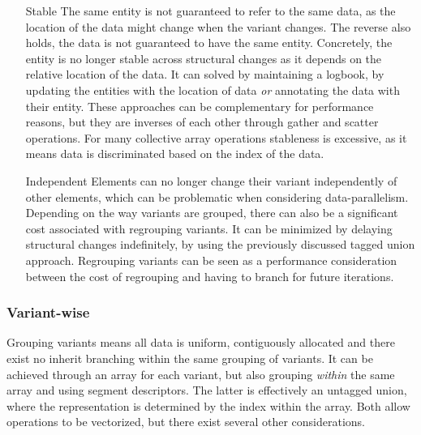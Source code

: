 \documentclass{article}
\begin{document}
\begin{itemize}
    \item [Stable] 
The same entity is not guaranteed to refer to the same data, as the location of the data might change when the variant changes.
The reverse also holds, the data is not guaranteed to have the same entity.
Concretely, the entity is no longer stable across structural changes as it depends on the relative location of the data.
It can solved by maintaining a logbook, by updating the entities with the location of data {\it or} annotating the data with their entity. 
These approaches can be complementary for performance reasons, but they are inverses of each other through gather and scatter operations. 
For many collective array operations stableness is excessive, as it means data is discriminated based on the index of the data. 
    \item [Independent]
Elements can no longer change their variant independently of other elements, which can be problematic when considering data-parallelism.
Depending on the way variants are grouped, there can also be a significant cost associated with regrouping variants.
It can be minimized by delaying structural changes indefinitely, by using the previously discussed tagged union approach.
Regrouping variants can be seen as a performance consideration between the cost of regrouping and having to branch for future iterations.

\end{itemize}    

\newpage

\subsubsection{Variant-wise}

Grouping variants means all data is uniform, contiguously allocated and there exist no inherit branching within the same grouping of variants.
It can be achieved through an array for each variant, but also grouping {\it within} the same array and using segment descriptors.
The latter is effectively an untagged union, where the representation is determined by the index within the array.
Both allow operations to be vectorized, but there exist several other considerations.
\end{document}
